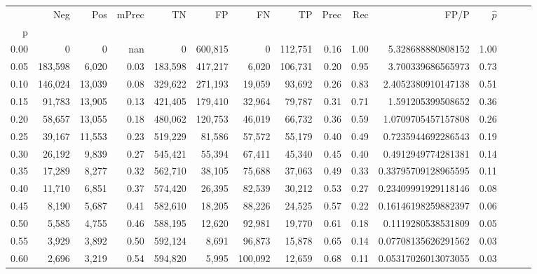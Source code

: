 \begin{tabular}{rrrrrrrrrrrrrrr}
\toprule
{} &      Neg &     Pos & mPrec &       TN &       FP &       FN &       TP &  Prec &   Rec &                   FP/P & $\hat{p}$ \\
p    &          &         &       &          &          &          &          &       &       &                        &           \\
\midrule
0.00 &        0 &       0 &   nan &        0 &  600,815 &        0 &  112,751 &  0.16 &  1.00 &      5.328688880808152 &      1.00 \\
0.05 &  183,598 &   6,020 &  0.03 &  183,598 &  417,217 &    6,020 &  106,731 &  0.20 &  0.95 &      3.700339686565973 &      0.73 \\
0.10 &  146,024 &  13,039 &  0.08 &  329,622 &  271,193 &   19,059 &   93,692 &  0.26 &  0.83 &     2.4052380910147138 &      0.51 \\
0.15 &   91,783 &  13,905 &  0.13 &  421,405 &  179,410 &   32,964 &   79,787 &  0.31 &  0.71 &      1.591205399508652 &      0.36 \\
0.20 &   58,657 &  13,055 &  0.18 &  480,062 &  120,753 &   46,019 &   66,732 &  0.36 &  0.59 &     1.0709705457157808 &      0.26 \\
0.25 &   39,167 &  11,553 &  0.23 &  519,229 &   81,586 &   57,572 &   55,179 &  0.40 &  0.49 &     0.7235944692286543 &      0.19 \\
0.30 &   26,192 &   9,839 &  0.27 &  545,421 &   55,394 &   67,411 &   45,340 &  0.45 &  0.40 &     0.4912949774281381 &      0.14 \\
0.35 &   17,289 &   8,277 &  0.32 &  562,710 &   38,105 &   75,688 &   37,063 &  0.49 &  0.33 &    0.33795709128965595 &      0.11 \\
0.40 &   11,710 &   6,851 &  0.37 &  574,420 &   26,395 &   82,539 &   30,212 &  0.53 &  0.27 &    0.23409991929118146 &      0.08 \\
0.45 &    8,190 &   5,687 &  0.41 &  582,610 &   18,205 &   88,226 &   24,525 &  0.57 &  0.22 &    0.16146198259882397 &      0.06 \\
0.50 &    5,585 &   4,755 &  0.46 &  588,195 &   12,620 &   92,981 &   19,770 &  0.61 &  0.18 &     0.1119280538531809 &      0.05 \\
0.55 &    3,929 &   3,892 &  0.50 &  592,124 &    8,691 &   96,873 &   15,878 &  0.65 &  0.14 &    0.07708135626291562 &      0.03 \\
0.60 &    2,696 &   3,219 &  0.54 &  594,820 &    5,995 &  100,092 &   12,659 &  0.68 &  0.11 &    0.05317026013073055 &      0.03 \\

\end{tabular}

